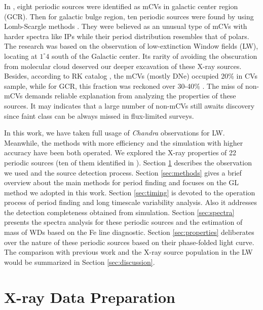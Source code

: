\documentclass[twoside,twocolumn]{aastex63}
\begin{document}
In \citet{2003ApJ...599..465M}, eight periodic sources were identified as mCVs in galactic center region (GCR). Then for galactic bulge region, ten periodic sources were found by using Lomb-Scargle methods \citep{2012ApJ...746..165H}. They were believed as an unusual type of mCVs with harder spectra like IPs while their period distribution resembles that of polars. The research was based on the observation of low-extinction Window fields (LW), locating at $1^{\circ}4$ south of the Galactic center. Its rarity of avoiding the obscuration from molecular cloud deserved our deeper excavation of these X-ray sources. 
Besides, according to RK catalog \citep{2003A&A...404..301R}, the mCVs (mostly DNe) occupied 20\% in CVs sample, while for GCR, this fraction was reckoned over 30-40\% \citep{2016ApJ...826..160H,2012ApJ...746..165H}. The miss of non-mCVs demands reliable explanation from analyzing the properties of these sources. It may indicates that a large number of non-mCVs still awaits discovery since faint class can be always missed in flux-limited surveys.

In this work, we have taken full usage of \emph{Chandra} observations for LW. Meanwhile, the methods with more efficiency and the simulation with higher accuracy have been both operated. We explored the X-ray properties of 22 periodic sources (ten of them identified in \cite{2012ApJ...746..165H}). 
Section \ref{sec:obs} describes the observation we used and the source detection process. Section \ref{sec:methods} gives a brief overview about the main methods for period finding and focuses on the GL method we adopted in this work. Section \ref{sec:timing} is devoted to the operation process of period finding and long timescale variability analysis. Also it addresses the detection completeness obtained from simulation. Section \ref{sec:spectra} presents the spectra analysis for these periodic sources and the estimation of mass of WDs based on the Fe line diagnostic. Section \ref{sec:properties} deliberates over the nature of these periodic sources based on their phase-folded light curve. The comparison with previous work and the X-ray source population in the LW would be summarized in Section \ref{sec:discussion}.

\section{X-ray Data Preparation} \label{sec:obs}
\end{document}
